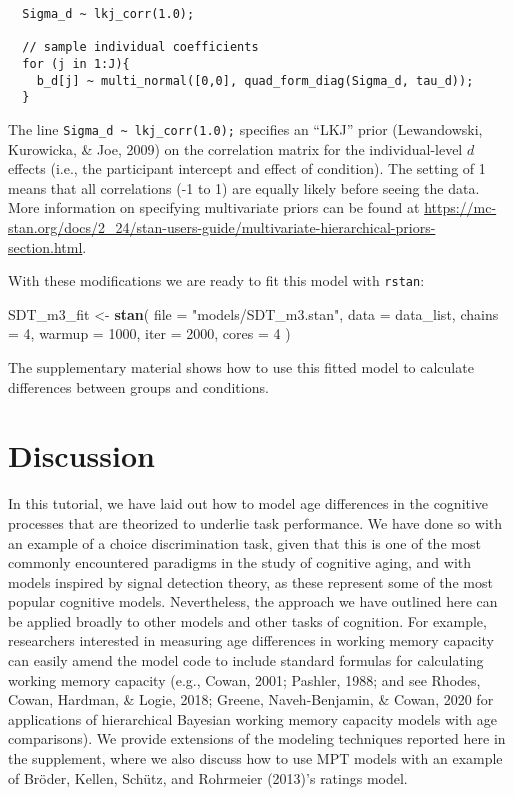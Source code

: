 \documentclass[
  english,
  ,man,floatsintext]{apa6}
\newenvironment{Shaded}{\begin{snugshade}}{\end{snugshade}}
\newcommand{\DataTypeTok}[1]{\textcolor[rgb]{0.13,0.29,0.53}{#1}}
\newcommand{\DecValTok}[1]{\textcolor[rgb]{0.00,0.00,0.81}{#1}}
\newcommand{\KeywordTok}[1]{\textcolor[rgb]{0.13,0.29,0.53}{\textbf{#1}}}
\newcommand{\NormalTok}[1]{#1}
\newcommand{\StringTok}[1]{\textcolor[rgb]{0.31,0.60,0.02}{#1}}
\begin{document}
\begin{verbatim}
  Sigma_d ~ lkj_corr(1.0);

  // sample individual coefficients
  for (j in 1:J){
    b_d[j] ~ multi_normal([0,0], quad_form_diag(Sigma_d, tau_d));
  }
\end{verbatim}

The line \texttt{Sigma\_d\ \textasciitilde{}\ lkj\_corr(1.0);} specifies an \enquote{LKJ} prior (Lewandowski, Kurowicka, \& Joe, 2009) on the correlation matrix for the individual-level \(d\) effects (i.e., the participant intercept and effect of condition). The setting of 1 means that all correlations (-1 to 1) are equally likely before seeing the data. More information on specifying multivariate priors can be found at \url{https://mc-stan.org/docs/2_24/stan-users-guide/multivariate-hierarchical-priors-section.html}.

With these modifications we are ready to fit this model with \texttt{rstan}:

\begin{Shaded}
\begin{Highlighting}[]
\NormalTok{SDT_m3_fit <-}\StringTok{ }\KeywordTok{stan}\NormalTok{(}
  \DataTypeTok{file =} \StringTok{"models/SDT_m3.stan"}\NormalTok{,}
  \DataTypeTok{data =}\NormalTok{ data_list,}
  \DataTypeTok{chains =} \DecValTok{4}\NormalTok{,}
  \DataTypeTok{warmup =} \DecValTok{1000}\NormalTok{,}
  \DataTypeTok{iter =} \DecValTok{2000}\NormalTok{,}
  \DataTypeTok{cores =} \DecValTok{4}
\NormalTok{)}
\end{Highlighting}
\end{Shaded}

The supplementary material shows how to use this fitted model to calculate differences between groups and conditions.

\hypertarget{discussion}{%
\section{Discussion}\label{discussion}}

In this tutorial, we have laid out how to model age differences in the cognitive processes that are theorized to underlie task performance. We have done so with an example of a choice discrimination task, given that this is one of the most commonly encountered paradigms in the study of cognitive aging, and with models inspired by signal detection theory, as these represent some of the most popular cognitive models. Nevertheless, the approach we have outlined here can be applied broadly to other models and other tasks of cognition. For example, researchers interested in measuring age differences in working memory capacity can easily amend the model code to include standard formulas for calculating working memory capacity (e.g., Cowan, 2001; Pashler, 1988; and see Rhodes, Cowan, Hardman, \& Logie, 2018; Greene, Naveh-Benjamin, \& Cowan, 2020 for applications of hierarchical Bayesian working memory capacity models with age comparisons). We provide extensions of the modeling techniques reported here in the supplement, where we also discuss how to use MPT models with an example of Bröder, Kellen, Schütz, and Rohrmeier (2013)'s ratings model.
\end{document}
